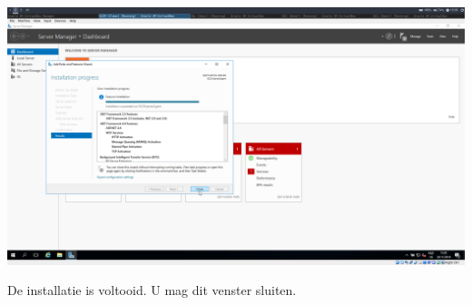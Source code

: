 \documentclass[a4paper]{article}
\begin{document}
\begin{center}
	\includegraphics[width=15cm]{Pictures/SCCM/3/1543500314.png}
	
	De installatie is voltooid. U mag dit venster sluiten.
\end{center}
\end{document}
